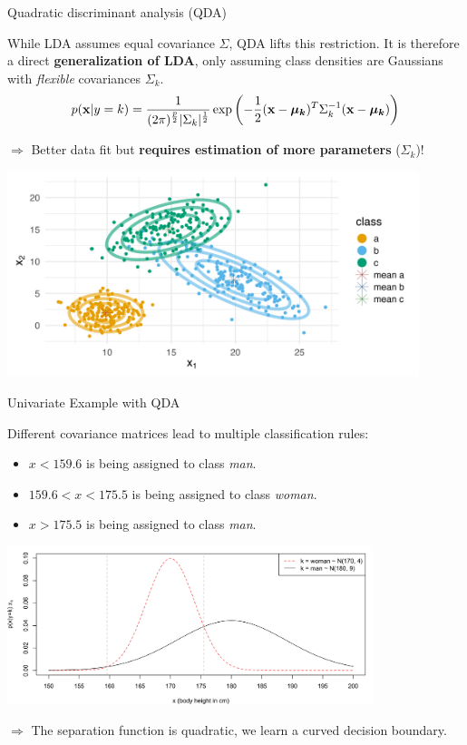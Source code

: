 \documentclass[11pt,compress,t,notes=noshow, xcolor=table]{beamer}
\begin{document}
\begin{vbframe}{Quadratic discriminant analysis (QDA)}

While LDA assumes equal covariance $\Sigma$, QDA lifts this restriction. It is therefore a direct \textbf{generalization of LDA}, only assuming class densities are Gaussians with \textit{flexible} covariances $\Sigma_k$.
$$
p(\mathbf{x} | y= k) = \frac{1}{(2\pi)^{\frac{p}{2}}|\Sigma_k|^{\frac{1}{2}}} \exp\left(-\frac{1}{2}(\mathbf{x} - \bm{\mu_{k}})^T \Sigma_k^{-1} (\mathbf{x} - \bm{\mu_{k}})\right)
$$

$\Rightarrow$ Better data fit but \textbf{requires estimation of more parameters} ($\Sigma_k$)!

\vspace{-0.5em}
\begin{center}
\includegraphics[width=0.9\textwidth, clip=true, trim={0 75 0 45}]{figure/disc_analysis-qda_2.png}
\end{center}

\end{vbframe}

\begin{vbframe}{Univariate Example with QDA}
\begin{small}
Different covariance matrices lead to multiple classification rules:
\begin{itemize}
  \item $x < 159.6$ is being assigned to class \textit{man}.
  \item $159.6 < x < 175.5$ is being assigned to class \textit{woman}.
  \item $x > 175.5$ is being assigned to class \textit{man}.
\end{itemize}
\begin{center}
\includegraphics[width=0.8\textwidth, clip=true, trim={0 0 0 0}]{figure/disc_univariate-4.png}
\end{center}
$\Rightarrow$ The separation function is quadratic, we learn a curved decision boundary.
\end{small}
\end{vbframe}
\end{document}
